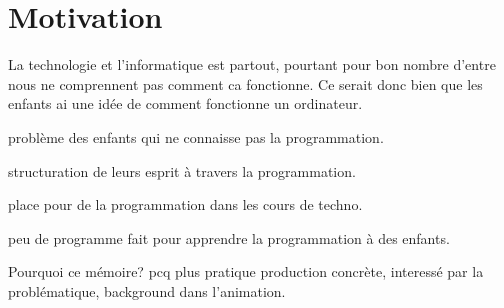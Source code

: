 \section{Motivation}
La technologie et l'informatique est partout, pourtant pour bon nombre d'entre nous ne comprennent pas comment ca fonctionne. Ce serait donc bien que les enfants ai une idée de comment fonctionne un ordinateur.

problème des enfants qui ne connaisse pas la programmation.

structuration de leurs esprit à travers la programmation.

place pour de la programmation dans les cours de techno.

peu de programme fait pour apprendre la programmation à des enfants.

Pourquoi ce mémoire? pcq plus pratique production concrète, interessé par la problématique, background dans l'animation.
